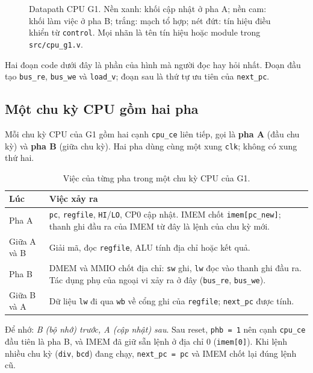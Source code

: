 \begin{figure}[htbp]
\centering
\resizebox{\linewidth}{!}{}
\caption{Datapath CPU G1. Nền xanh: khối cập nhật ở pha A; nền cam: khối làm việc ở pha B; trắng: mạch tổ hợp; nét đứt: tín hiệu điều khiển từ \texttt{control}. Mọi nhãn là tên tín hiệu hoặc module trong \texttt{src/cpu\_g1.v}.}\label{fig:h2}
\end{figure}

Hai đoạn code dưới đây là phần của hình mà người đọc hay hỏi nhất. Đoạn đầu tạo \texttt{bus\_re}, \texttt{bus\_we} và \texttt{load\_v}; đoạn sau là thứ tự ưu tiên của \texttt{next\_pc}.

\subsection{Một chu kỳ CPU gồm hai pha}\label{sec:2pha}
Mỗi chu kỳ CPU của G1 gồm hai cạnh \texttt{cpu\_ce} liên tiếp, gọi là \textbf{pha A} (đầu chu kỳ) và \textbf{pha B} (giữa chu kỳ). Hai pha dùng cùng một xung \texttt{clk}; không có xung thứ hai.

\begin{table}[htbp]
\centering\small
\begin{tabular}{@{}l p{11cm}@{}}
\toprule
Lúc & Việc xảy ra \\
\midrule
Pha A & \texttt{pc}, \texttt{regfile}, \texttt{HI}/\texttt{LO}, CP0 cập nhật. IMEM chốt \texttt{imem[pc\_new]}; thanh ghi đầu ra của IMEM từ đây là lệnh của chu kỳ mới. \\
Giữa A và B & Giải mã, đọc \texttt{regfile}, ALU tính địa chỉ hoặc kết quả. \\
Pha B & DMEM và MMIO chốt địa chỉ: \texttt{sw} ghi, \texttt{lw} đọc vào thanh ghi đầu ra. Tác dụng phụ của ngoại vi xảy ra ở đây (\texttt{bus\_re}, \texttt{bus\_we}). \\
Giữa B và A & Dữ liệu \texttt{lw} đi qua \texttt{wb} về cổng ghi của \texttt{regfile}; \texttt{next\_pc} được tính. \\
\bottomrule
\end{tabular}
\caption{Việc của từng pha trong một chu kỳ CPU của G1.}\label{tab:2pha}
\end{table}

Để nhớ: \emph{B (bộ nhớ) trước, A (cập nhật) sau}. Sau reset, \texttt{phb = 1} nên cạnh \texttt{cpu\_ce} đầu tiên là pha B, và IMEM đã giữ sẵn lệnh ở địa chỉ 0 (\texttt{imem[0]}). Khi lệnh nhiều chu kỳ (\texttt{div}, \texttt{bcd}) đang chạy, \texttt{next\_pc = pc} và IMEM chốt lại đúng lệnh cũ.

